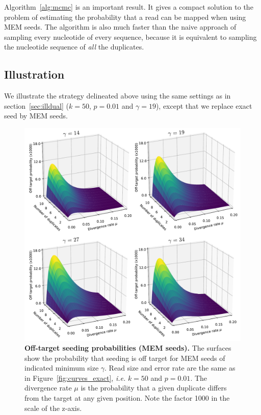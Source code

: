 \documentclass{article}
\begin{document}
Algorithm~\ref{alg:mcmc} is an important result. It gives a compact
solution to the problem of estimating the probability that a read can be
mapped when using MEM seeds. The algorithm is also much faster than the
naive approach of sampling every nucleotide of every sequence, because it
is equivalent to sampling the nucleotide sequence of \emph{all} the
duplicates.

\subsection{Illustration}
\label{sec:illmem}

We illustrate the strategy delineated above 
using the same settings as in section~\ref{sec:illdual} ($k=50$, $p=0.01$
and $\gamma=19$), except that we replace exact seed by MEM seeds.

\begin{figure}[h]
\centering
\includegraphics[scale=.48]{curves_mem.pdf}
\caption{\textbf{Off-target seeding probabilities (MEM seeds).}
The surfaces show the probability that seeding is off target for MEM seeds
of indicated minimum size $\gamma$. Read size and error rate are the same
as in Figure~\ref{fig:curves_exact}, \textit{i.e.} $k=50$ and $p=0.01$.
The divergence rate $\mu$ is the probability that a given duplicate
differs from the target at any given position. Note the factor 1000 in the
scale of the z-axis.}
\label{fig:curves_mem}
\end{figure}
\end{document}

